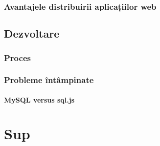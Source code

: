 \documentclass[12pt, a4paper, twoside, romanian]{teza-upb}
\begin{document}
    \subsection{Avantajele distribuirii aplicațiilor web}

  \section{Dezvoltare}

    \subsection{Proces}

    \subsection{Probleme întâmpinate}
      \subsubsection{MySQL versus sql.js} %
      \label{ssub:MySQL versus sql.js}




\appendix
\chapter {Sup}
\end{document}
